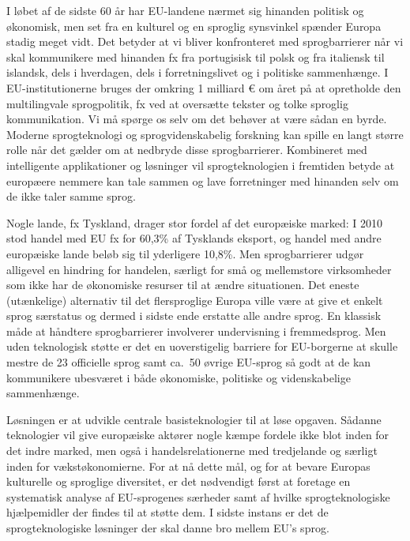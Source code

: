 \begin{multicols}{2}
 

 I l\o bet af de sidste 60 \mbox{\aa}r har EU-landene n\ae rmet sig hinanden politisk og \o konomisk, men set fra en kulturel og en sproglig synsvinkel sp\ae nder Europa stadig meget vidt.
Det betyder at vi bliver konfronteret med sprogbarrierer \mbox{n\aa r} vi skal kommunikere med hinanden fx fra portugisisk til polsk og fra italiensk til islandsk, dels i hverdagen, dels i forretningslivet og i politiske sammenh\ae nge. I EU-institutionerne bruges der omkring 1 milliard € om \aa ret \mbox{p\aa} at opretholde den multilingvale sprogpolitik, fx ved at overs\ae tte tekster og tolke sproglig kommunikation. Vi \mbox{m\aa} sp\o rge os selv om det beh\o ver at v\ae re s\aa dan en byrde. Moderne sprogteknologi og sprogvidenskabelig forskning kan spille en langt st\o rre rolle n\aa r det g\ae lder om at nedbryde disse sprogbarrierer. Kombineret med intelligente applikationer og l\o sninger vil sprogteknologien i fremtiden betyde at europ\ae ere nemmere kan tale sammen og lave forretninger med hinanden selv om de ikke taler samme sprog.


Nogle lande, fx Tyskland, drager stor fordel af det europ\ae iske marked: I 2010 stod handel med EU fx for 60,3\% af Tysklands eksport, og handel med andre europ\ae iske lande bel\o b sig til yderligere 10,8\%. Men sprogbarrierer udg\o r alligevel en hindring for handelen, s\ae rligt for \mbox{sm\aa} og mellemstore virksomheder som ikke har de \o konomiske resurser til at \ae ndre situationen. Det eneste (ut\ae nkelige) alternativ til det flersproglige Europa ville v\ae re at give et enkelt sprog s\ae rstatus og dermed i sidste ende erstatte alle andre sprog. En klassisk m\aa de at h\aa ndtere sprogbarrierer involverer undervisning i fremmedsprog. Men uden teknologisk st\o tte er det en uoverstigelig barriere for EU-borgerne at skulle mestre de 23 officielle sprog samt ca.\ 50 \o vrige EU-sprog \mbox{s\aa} godt at de kan kommunikere ubesv\ae ret i b\aa de \o konomiske, politiske og videnskabelige sammenh\ae nge. 

L\o sningen er at udvikle centrale basisteknologier til at l\o se opgaven. S\aa danne teknologier vil give europ\ae iske akt\o rer nogle k\ae mpe fordele ikke blot inden for det indre marked, men \mbox{ogs\aa} i handelsrelationerne med tredjelande og s\ae rligt inden for v\ae kst\o konomierne. For at \mbox{n\aa} dette m\aa l, og for at bevare Europas kulturelle og sproglige diversitet, er det n\o dvendigt f\o rst at foretage en systematisk analyse af EU-sprogenes s\ae rheder samt af hvilke sprogteknologiske hj\ae lpemidler der findes til at st\o tte dem. I sidste instans er det de sprogteknologiske l\o sninger der skal danne bro mellem EU's sprog.



\end{multicols}
